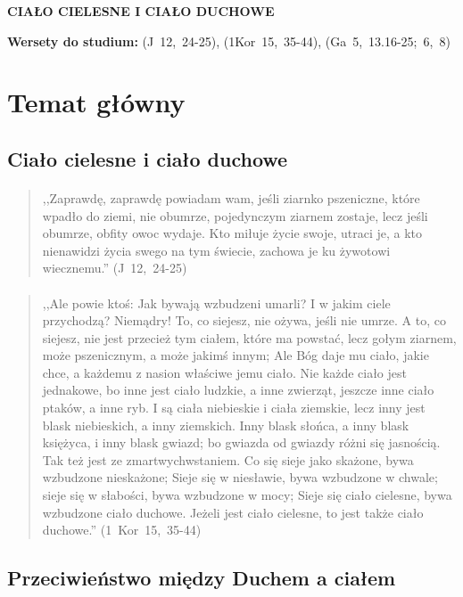 \documentclass[10pt,a4paper,oneside]{article}
\begin{document}
\centerline{\textbf{\MakeUppercase{Ciało cielesne i ciało duchowe}}}
\begin{center}
\textbf{Wersety do studium:} \mbox{(J 12, 24-25)}, \mbox{(1Kor 15, 35-44)}, \mbox{(Ga 5, 13.16-25; 6, 8)}
\end{center}
\section{Temat główny}
\subsection{Ciało cielesne i ciało duchowe}
\paragraph{}
\begin{quote}
,,Zaprawdę, zaprawdę powiadam wam, jeśli ziarnko pszeniczne, które wpadło do ziemi, nie obumrze, pojedynczym ziarnem zostaje, lecz jeśli obumrze, obfity owoc wydaje. Kto miłuje życie swoje, utraci je, a kto nienawidzi życia swego na tym świecie, zachowa je ku żywotowi wiecznemu.'' \mbox{(J 12, 24-25)}
\end{quote}
\paragraph{}
\begin{quote}
,,Ale powie ktoś: Jak bywają wzbudzeni umarli? I w jakim ciele przychodzą? Niemądry! To, co siejesz, nie ożywa, jeśli nie umrze. A to, co siejesz, nie jest przecież tym ciałem, które ma powstać, lecz gołym ziarnem, może pszenicznym, a może jakimś innym; Ale Bóg daje mu ciało, jakie chce, a każdemu z nasion właściwe jemu ciało. Nie każde ciało jest jednakowe, bo inne jest ciało ludzkie, a inne zwierząt, jeszcze inne ciało ptaków, a inne ryb. I są ciała niebieskie i ciała ziemskie, lecz inny jest blask niebieskich, a inny ziemskich. Inny blask słońca, a inny blask księżyca, i inny blask gwiazd; bo gwiazda od gwiazdy różni się jasnością. Tak też jest ze zmartwychwstaniem. Co się sieje jako skażone, bywa wzbudzone nieskażone; Sieje się w niesławie, bywa wzbudzone w chwale; sieje się w słabości, bywa wzbudzone w mocy; Sieje się ciało cielesne, bywa wzbudzone ciało duchowe. Jeżeli jest ciało cielesne, to jest także ciało duchowe.'' \mbox{(1 Kor 15, 35-44)}
\end{quote}
\subsection{Przeciwieństwo między Duchem a ciałem}
\end{document}
